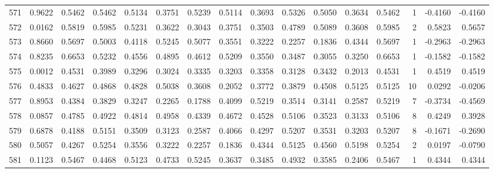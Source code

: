 \begin{tabular}{lrrrrrrrrrrrrrrr}
571 &      0.9622 &  0.5462 &  0.5462 &  0.5134 &  0.3751 &  0.5239 &  0.5114 &  0.3693 &  0.5326 &  0.5050 &   0.3634 &     0.5462 &      1 &                   -0.4160 &                    -0.4160 \\
572 &      0.0162 &  0.5819 &  0.5985 &  0.5231 &  0.3622 &  0.3043 &  0.3751 &  0.3503 &  0.4789 &  0.5089 &   0.3608 &     0.5985 &      2 &                    0.5823 &                     0.5657 \\
573 &      0.8660 &  0.5697 &  0.5003 &  0.4118 &  0.5245 &  0.5077 &  0.3551 &  0.3222 &  0.2257 &  0.1836 &   0.4344 &     0.5697 &      1 &                   -0.2963 &                    -0.2963 \\
574 &      0.8235 &  0.6653 &  0.5232 &  0.4556 &  0.4895 &  0.4612 &  0.5209 &  0.3550 &  0.3487 &  0.3055 &   0.3250 &     0.6653 &      1 &                   -0.1582 &                    -0.1582 \\
575 &      0.0012 &  0.4531 &  0.3989 &  0.3296 &  0.3024 &  0.3335 &  0.3203 &  0.3358 &  0.3128 &  0.3432 &   0.2013 &     0.4531 &      1 &                    0.4519 &                     0.4519 \\
576 &      0.4833 &  0.4627 &  0.4868 &  0.4828 &  0.5038 &  0.3608 &  0.2052 &  0.3772 &  0.3879 &  0.4508 &   0.5125 &     0.5125 &     10 &                    0.0292 &                    -0.0206 \\
577 &      0.8953 &  0.4384 &  0.3829 &  0.3247 &  0.2265 &  0.1788 &  0.4099 &  0.5219 &  0.3514 &  0.3141 &   0.2587 &     0.5219 &      7 &                   -0.3734 &                    -0.4569 \\
578 &      0.0857 &  0.4785 &  0.4922 &  0.4814 &  0.4958 &  0.4339 &  0.4672 &  0.4528 &  0.5106 &  0.3523 &   0.3133 &     0.5106 &      8 &                    0.4249 &                     0.3928 \\
579 &      0.6878 &  0.4188 &  0.5151 &  0.3509 &  0.3123 &  0.2587 &  0.4066 &  0.4297 &  0.5207 &  0.3531 &   0.3203 &     0.5207 &      8 &                   -0.1671 &                    -0.2690 \\
580 &      0.5057 &  0.4267 &  0.5254 &  0.3556 &  0.3222 &  0.2257 &  0.1836 &  0.4344 &  0.5125 &  0.4560 &   0.5198 &     0.5254 &      2 &                    0.0197 &                    -0.0790 \\
581 &      0.1123 &  0.5467 &  0.4468 &  0.5123 &  0.4733 &  0.5245 &  0.3637 &  0.3485 &  0.4932 &  0.3585 &   0.2406 &     0.5467 &      1 &                    0.4344 &                     0.4344 \\

\end{tabular}
